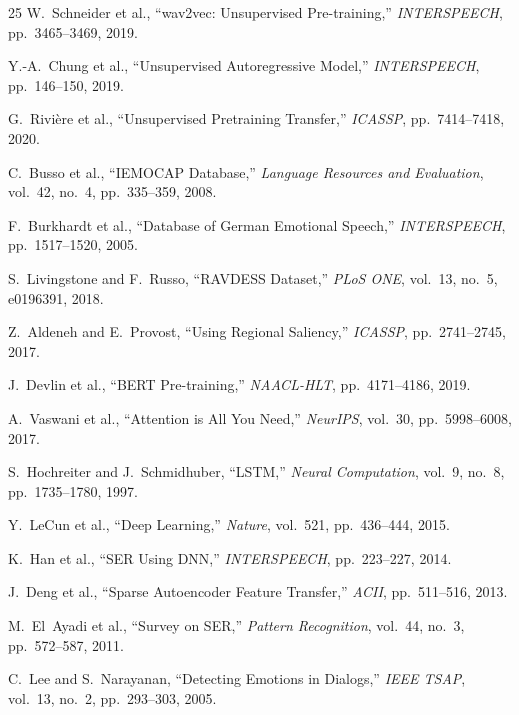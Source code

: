 \documentclass[conference]{IEEEtran}
\begin{document}
\begin{thebibliography}{25}
W.~Schneider et al.,
``wav2vec: Unsupervised Pre-training,''
\textit{INTERSPEECH}, pp.~3465--3469, 2019.

Y.-A.~Chung et al.,
``Unsupervised Autoregressive Model,''
\textit{INTERSPEECH}, pp.~146--150, 2019.

G.~Rivi\`{e}re et al.,
``Unsupervised Pretraining Transfer,''
\textit{ICASSP}, pp.~7414--7418, 2020.

C.~Busso et al.,
``IEMOCAP Database,''
\textit{Language Resources and Evaluation}, vol.~42, no.~4, pp.~335--359, 2008.

F.~Burkhardt et al.,
``Database of German Emotional Speech,''
\textit{INTERSPEECH}, pp.~1517--1520, 2005.

S.~Livingstone and F.~Russo,
``RAVDESS Dataset,''
\textit{PLoS ONE}, vol.~13, no.~5, e0196391, 2018.

Z.~Aldeneh and E.~Provost,
``Using Regional Saliency,''
\textit{ICASSP}, pp.~2741--2745, 2017.

J.~Devlin et al.,
``BERT Pre-training,''
\textit{NAACL-HLT}, pp.~4171--4186, 2019.

A.~Vaswani et al.,
``Attention is All You Need,''
\textit{NeurIPS}, vol.~30, pp.~5998--6008, 2017.

S.~Hochreiter and J.~Schmidhuber,
``LSTM,''
\textit{Neural Computation}, vol.~9, no.~8, pp.~1735--1780, 1997.

Y.~LeCun et al.,
``Deep Learning,''
\textit{Nature}, vol.~521, pp.~436--444, 2015.

K.~Han et al.,
``SER Using DNN,''
\textit{INTERSPEECH}, pp.~223--227, 2014.

J.~Deng et al.,
``Sparse Autoencoder Feature Transfer,''
\textit{ACII}, pp.~511--516, 2013.

M.~El~Ayadi et al.,
``Survey on SER,''
\textit{Pattern Recognition}, vol.~44, no.~3, pp.~572--587, 2011.

C.~Lee and S.~Narayanan,
``Detecting Emotions in Dialogs,''
\textit{IEEE TSAP}, vol.~13, no.~2, pp.~293--303, 2005.

\end{thebibliography}
\end{document}
